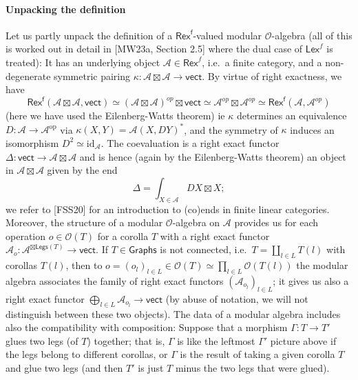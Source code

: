 \documentclass[11pt]{article}
\newcommand{\Rexf}{\mathsf{Rex}^{\mathsf{f}}}
\newcommand{\cA}{\mathcal{A}}
\theoremstyle{definition}
\begin{document}
\paragraph{Unpacking the definition}
Let us partly unpack the definition of a $\Rexf$-valued modular $\mathcal{O}$-algebra (all of this is worked out in detail in [MW23a, Section 2.5] where the dual case of $\mathsf{Lex}^f$ is treated): It has an underlying object $\mathcal{A} \in \mathsf{Rex}^f$, i.e.\ a finite category, and a non-degenerate symmetric pairing $\kappa : \mathcal{A} \boxtimes \mathcal{A} \to \mathsf{vect}$. By virtue of right exactness, we have
$$ \Rexf(\cA \boxtimes \cA , \mathsf{vect}) \simeq (\cA \boxtimes \cA)^{op} \boxtimes    \mathsf{vect} \simeq  \cA^{op} \boxtimes \cA^{op} \simeq \Rexf (\cA, \cA^{op})$$
(here we have used the Eilenberg-Watts theorem) ie $\kappa$ determines an equivalence $D : \mathcal{A} \to \mathcal{A}^{\mathrm{op}}$ via $\kappa(X, Y) = \mathcal{A}(X, DY)^*$, and the symmetry of $\kappa$ induces an isomorphism $D^2 \simeq \mathrm{id}_{\mathcal{A}}$. The coevaluation is a right exact functor $\Delta : \mathsf{vect} \to \mathcal{A} \boxtimes \mathcal{A}$ and is hence (again by the Eilenberg-Watts theorem) an object in $\mathcal{A} \boxtimes \mathcal{A}$ given by the end
\[
\Delta = \int_{X \in \mathcal{A}} D X \boxtimes X;
\]
we refer to [FSS20] for an introduction to (co)ends in finite linear categories. Moreover, the structure of a modular $\mathcal{O}$-algebra on $\mathcal{A}$ provides us for each operation $o \in \mathcal{O}(T)$ for a corolla $T$ with a right exact functor $\mathcal{A}_o : \mathcal{A}^{\boxtimes \mathsf{Legs}(T)} \to \mathsf{vect}$. If $T \in \mathsf{Graphs}$ is not connected, i.e.\ $T = \coprod_{l \in L} T(l)$ with corollas $T(l)$, then to $o = (o_l)_{l \in L} \in \mathcal{O}(T) \simeq \prod_{l \in L} \mathcal{O}(T(l))$ the modular algebra associates the family of right exact functors $(\mathcal{A}_{o_l})_{l \in L}$; it gives us also a right exact functor $\bigoplus_{l \in L} \mathcal{A}_{o_l} \to \mathsf{vect}$ (by abuse of notation, we will not distinguish between these two objects). The data of a modular algebra includes also the compatibility with composition: Suppose that a morphism $\Gamma: T \to T'$ glues two legs (of $T$) together; that is, $\Gamma$ is like the leftmost $\Gamma'$ picture above if the legs belong to different corollas, or $\Gamma$ is the result of taking a given corolla $T$ and glue two legs (and then $T'$ is just $T$ minus the two legs that were glued).
\end{document}
